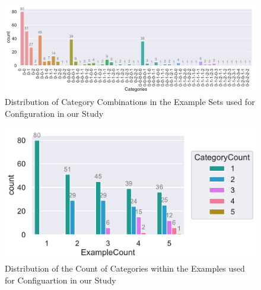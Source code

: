 \documentclass[\myrootdir/main.tex]{subfiles}
\begin{document}
\begin{figure}[htbp]
	\centering
	\includegraphics[width=\textwidth, clip]{img/big-study/categories-dataset.pdf}
	\caption{Distribution of Category Combinations in the Example Sets used for Configuration in our Study}
	\label{fig:categories-dataset}
\end{figure}
\begin{figure}[htbp]
	\centering
	\begin{minipage}{0.45\textwidth}
		\centering
		\includegraphics[width=\textwidth, clip]{img/big-study/categorycount-examplecount-dataset.pdf}
		\caption{Distribution of the Count of Categories within the Examples used for Configuartion in our Study}
		\label{fig:categorycount-examplecount-dataset}
	\end{minipage}\hfill
	\begin{minipage}{0.45\textwidth}
		\centering

\end{minipage}
\end{figure}
\end{document}
